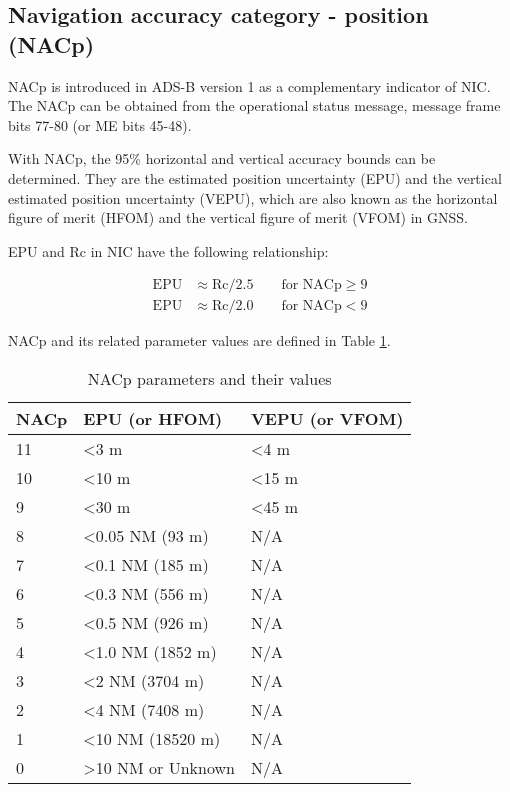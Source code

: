 \subsection{Navigation accuracy category - position (NACp)}

NACp is introduced in ADS-B version 1 as a complementary indicator of NIC. The NACp can be obtained from the operational status message, message frame bits 77-80 (or ME bits 45-48).

With NACp, the 95\% horizontal and vertical accuracy bounds can be determined. They are the estimated position uncertainty (EPU) and the vertical estimated position uncertainty (VEPU), which are also known as the horizontal figure of merit (HFOM) and the vertical figure of merit (VFOM) in GNSS. 

EPU and Rc in NIC have the following relationship:

\begin{equation}
  \begin{split}
    \mathrm{EPU} &\approx \mathrm{Rc} / 2.5   \qquad  \text{for NACp} \ge 9 \\
    \mathrm{EPU} &\approx \mathrm{Rc} / 2.0  \qquad  \text{for NACp} < 9
  \end{split}
\end{equation}

NACp and its related parameter values are defined in Table \ref{tb:nacp-params}.

\begin{table}[]
\caption{NACp parameters and their values}
\label{tb:nacp-params}
\begin{tabular}{|l|l|l|}
\hline
\textbf{NACp} & \textbf{EPU (or HFOM)} & \textbf{VEPU (or VFOM)} \\ \hline \hline
11 & \textless 3 m & \textless 4 m \\ \hline
10 & \textless 10 m & \textless 15 m \\ \hline
9 & \textless 30 m & \textless 45 m \\ \hline
8 & \textless 0.05 NM (93 m) & N/A \\ \hline
7 & \textless 0.1 NM (185 m) & N/A \\ \hline
6 & \textless 0.3 NM (556 m) & N/A \\ \hline
5 & \textless 0.5 NM (926 m) & N/A \\ \hline
4 & \textless 1.0 NM (1852 m) & N/A \\ \hline
3 & \textless 2 NM (3704 m) & N/A \\ \hline
2 & \textless 4 NM (7408 m) & N/A \\ \hline
1 & \textless 10 NM (18520 m) & N/A \\ \hline
0 & \textgreater 10 NM or Unknown & N/A \\ \hline
\end{tabular}
\end{table}



